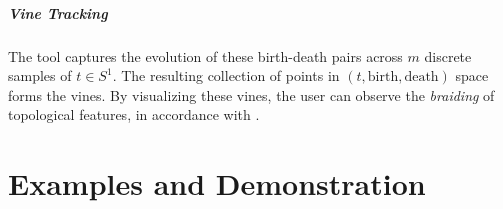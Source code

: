 \documentclass[a4paper,english,numberwithinsect]{eurocg26}
\begin{document}
\subparagraph{Vine Tracking}
The tool captures the evolution of these birth-death pairs across $m$ discrete samples of $t \in S^1$. The resulting collection of points in $(t, \text{birth}, \text{death})$ space forms the vines. By visualizing these vines, the user can observe the \textit{braiding} of topological features, in accordance with \cite{chambers2025braidingvineyards}.


    
    



\section{Examples and Demonstration}
\end{document}
